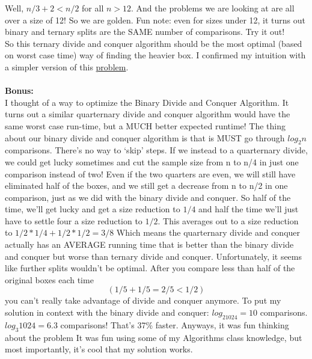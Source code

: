\documentclass[11pt]{article}
\begin{document}
\indent Well, $n/3 + 2 < n/2$ for all $n > 12$. And the problems we are looking at are all over a size of 12! So we are golden. Fun note: even for sizes under 12, it turns out binary and ternary splits are the SAME number of comparisons. Try it out!\\
\indent So this ternary divide and conquer algorithm should be the most optimal (based on worst case time) way of finding the heavier box. I confirmed my intuition with a simpler version of this \href{http://en.wikipedia.org/wiki/Balance_puzzle}{problem}.
\\\\
\textbf{Bonus:} \\
\indent I thought of a way to optimize the Binary Divide and Conquer Algorithm. It turns out a similar quarternary divide and conquer algorithm would have the same worst case run-time, but a MUCH better expected runtime! The thing about our binary divide and conquer algorithm is that is MUST go through $log_2{n}$ comparisons. There’s no way to ‘skip’ steps. If we instead to a quarternary divide, we could get lucky sometimes and cut the sample size from n to n/4 in just one comparison instead of two! Even if the two quarters are even, we will still have eliminated half of the boxes, and we still get a decrease from n to n/2 in one comparison, just as we did with the binary divide and conquer. \newline
\indent So half of the time, we’ll get lucky and get a size reduction to $1/4$ and half the time we’ll just have to settle four a size reduction to $1/2$. This averages out to a size reduction to $1/2*1/4 + 1/2*1/2 = 3/8$ Which means the quarternary divide and conquer actually has an AVERAGE running time that is better than the binary divide and conquer but worse than ternary divide and conquer. 
\indent Unfortunately, it seems like further splits wouldn’t be optimal. After you compare less than half of the original boxes each time $$(1/5 + 1/5 = 2/5 < 1/2)$$ you can’t really take advantage of divide and conquer anymore. 
\indent To put my solution in context with the binary divide and conquer: $log_21024 = 10$ comparisons. $log_3{1024} = 6.3$ comparisons! That’s 37\% faster. \newline
\indent Anyways, it was fun thinking about the problem\! It was fun using some of my Algorithms class knowledge, but most importantly, it’s cool that my solution works. 	
\end{document}
